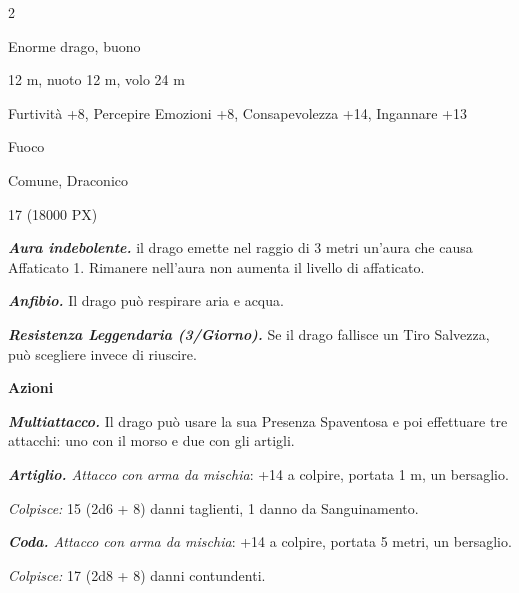 \begin{multicols}{2}
{
\begin{description}[noitemsep, topsep=0pt, parsep=0pt, partopsep=0pt, itemsep=1pt, leftmargin=2.35cm,  labelwidth=2.2cm, itemindent=0cm, listparindent=0pt] %
\setlength{\baselineskip}{10pt}
\item[\textbf{Taglia/Tipo}] Enorme drago, buono
\item[\textbf{Caratt.}] 
\item[\textbf{Punti Ferita}] 
\item[\textbf{Movimento}] 12 m, nuoto 12 m, volo 24 m
\item[\textbf{Tiri Salvez.}] 
\item[\textbf{Comp.}] Furtività +8, Percepire Emozioni +8, Consapevolezza +14, Ingannare +13
\item[\textbf{Imm. Danni}] Fuoco
\item[\textbf{Sensi}] 
\item[\textbf{Linguaggi}] Comune, Draconico
\item[\textbf{Sfida}] 17 (18000 PX)
\end{description}
\smallskip

\emph{\textbf{Aura indebolente.}} il drago emette nel raggio di 3 metri un'aura che causa Affaticato 1. Rimanere nell'aura non aumenta il livello di affaticato.

\emph{\textbf{Anfibio.}} Il drago può respirare aria e acqua.

\emph{\textbf{Resistenza Leggendaria (3/Giorno).}} Se il drago fallisce un Tiro Salvezza, può scegliere invece di riuscire.

\textbf{Azioni}

\emph{\textbf{Multiattacco.}} Il drago può usare la sua Presenza Spaventosa e poi effettuare tre attacchi: uno con il morso e due con gli artigli.

\emph{\textbf{Artiglio.} Attacco con arma da mischia}: +14 a colpire, portata 1 m, un bersaglio.

\emph{Colpisce:} 15 (2d6 + 8) danni taglienti, 1 danno da Sanguinamento.

\emph{\textbf{Coda.} Attacco con arma da mischia}: +14 a colpire, portata 5 metri, un bersaglio.

\emph{Colpisce:} 17 (2d8 + 8) danni contundenti.

}
\end{multicols}

